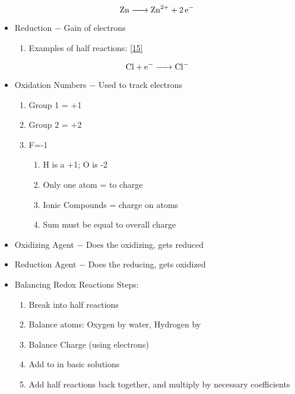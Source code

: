 \documentclass[12pt]{article}
\begin{document}
\begin{itemize}
    \begin{equation}
      \ce{Zn -> Zn^2+ + 2e-}
      \label{14}
    \end{equation}

  \item Reduction $-$ Gain of electrons

    \begin{enumerate}
      \item Examples of half reactions: \eqref{15}
    \end{enumerate}

    \begin{equation}
      \ce{Cl + e- -> Cl-}
      \label{15}
    \end{equation}

  \item Oxidation Numbers $-$ Used to track electrons

    \begin{enumerate}
      \item Group 1 = +1
      \item Group 2 = +2
      \item F=-1

        \begin{enumerate}
          \item H is a +1; O is -2
          \item Only one atom = to charge
          \item Ionic Compounds = charge on atoms
          \item Sum must be equal to overall charge
        \end{enumerate}

    \end{enumerate}

  \item Oxidizing Agent $-$ Does the oxidizing, gets reduced

  \item Reduction Agent $-$ Does the reducing, gets oxidized

  \item Balancing Redox Reactions Steps:

    \begin{enumerate}

      \item Break into half reactions
        
      \item Balance atoms: Oxygen by water, Hydrogen by 
        
      \item Balance Charge (using electrons)

      \item Add  to  in basic solutions

      \item Add half reactions back together, and multiply by necessary coefficients

    \end{enumerate}

\end{itemize}
\end{document}
